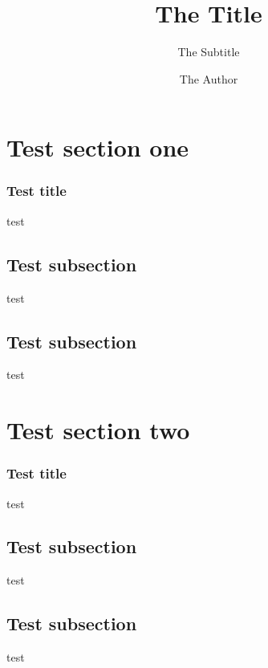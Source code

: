 \documentclass[11pt]{beamer}
\title{The Title}
\subtitle[The Subtitlein Footline]{The Subtitle}
\author{The Author}
\begin{document}
\begin{frame}
\maketitle
\end{frame}

\section{Test section one}
\begin{frame}
\frametitle{Test title}
test
\end{frame}
\subsection{Test subsection}
\begin{frame}
test
\end{frame}
\subsection{Test subsection}
\begin{frame}
test
\end{frame}

\section{Test section two}
\begin{frame}
\frametitle{Test title}
test
\end{frame}
\subsection{Test subsection}
\begin{frame}
test
\end{frame}
\subsection{Test subsection}
\begin{frame}
test
\end{frame}
\end{document}

